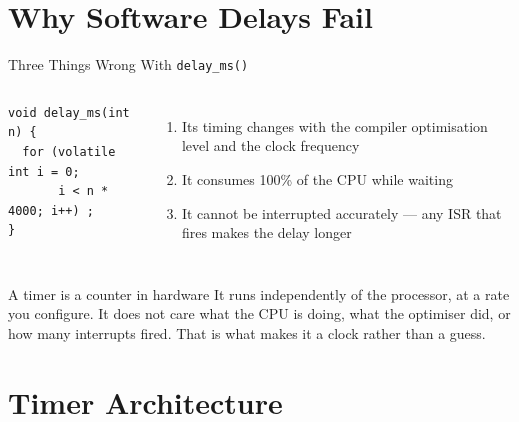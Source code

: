 \documentclass[aspectratio=169]{beamer}
\begin{document}
\section{Why Software Delays Fail}

\begin{frame}[fragile]{Three Things Wrong With \texttt{delay\_ms()}}
\begin{columns}[T]
\begin{lstlisting}
void delay_ms(int n) {
  for (volatile int i = 0;
       i < n * 4000; i++) ;
}
\end{lstlisting}
\begin{enumerate}
  \item Its timing changes with the compiler optimisation level and the clock frequency
  \item It consumes 100\% of the CPU while waiting
  \item It cannot be interrupted accurately --- any ISR that fires makes the delay longer
\end{enumerate}
\end{columns}
\vspace{1em}
\begin{block}{A timer is a counter in hardware}
It runs independently of the processor, at a rate you configure. It does
not care what the CPU is doing, what the optimiser did, or how many
interrupts fired. That is what makes it a clock rather than a guess.
\end{block}
\end{frame}

\section{Timer Architecture}
\end{document}
